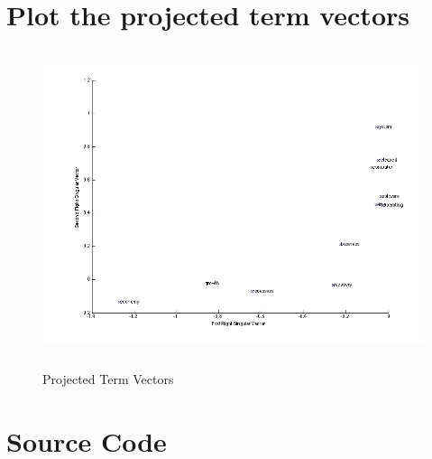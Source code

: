 \documentclass[11pt,a4paper]{article}
\begin{document}
\section{Plot the projected term vectors}
\begin{figure}[h]
    \centering
    \includegraphics[width=7in,height=3.5in]{./6s.png} \\
    \caption{Projected Term Vectors}
\end{figure}

\newpage
\section{Source Code}


\end{document}
